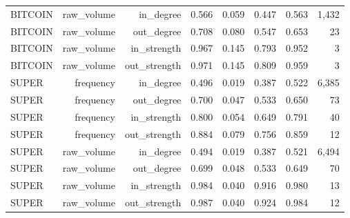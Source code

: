 \begin{table}[t]
\begin{tabular}{lrrrrrrr}
BITCOIN & raw\_volume & in\_degree & 0.566 & 0.059 & 0.447 & 0.563 & 1{,}432 \\
BITCOIN & raw\_volume & out\_degree & 0.708 & 0.080 & 0.547 & 0.653 & 23 \\
BITCOIN & raw\_volume & in\_strength & 0.967 & 0.145 & 0.793 & 0.952 & 3 \\
BITCOIN & raw\_volume & out\_strength & 0.971 & 0.145 & 0.809 & 0.959 & 3 \\
SUPER & frequency & in\_degree & 0.496 & 0.019 & 0.387 & 0.522 & 6{,}385 \\
SUPER & frequency & out\_degree & 0.700 & 0.047 & 0.533 & 0.650 & 73 \\
SUPER & frequency & in\_strength & 0.800 & 0.054 & 0.649 & 0.791 & 40 \\
SUPER & frequency & out\_strength & 0.884 & 0.079 & 0.756 & 0.859 & 12 \\
SUPER & raw\_volume & in\_degree & 0.494 & 0.019 & 0.387 & 0.521 & 6{,}494 \\
SUPER & raw\_volume & out\_degree & 0.699 & 0.048 & 0.533 & 0.649 & 70 \\
SUPER & raw\_volume & in\_strength & 0.984 & 0.040 & 0.916 & 0.980 & 13 \\
SUPER & raw\_volume & out\_strength & 0.987 & 0.040 & 0.924 & 0.984 & 12 \\
\bottomrule
\end{tabular}
\end{table}
